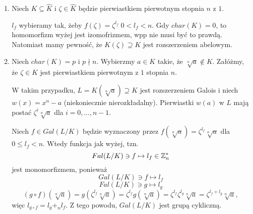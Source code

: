 \begin{enumerate}[leftmargin=*]
    \item Niech $K\subseteq\hat{K}$ i $\zeta\in\hat{K}$ będzie pierwiastkiem pierwotnym stopnia $n$ z $1$.
    
    \begin{center}\end{center}
    $l_f$ wybieramy tak, żeby $f(\zeta)=\zeta^{l_f}\;0<l_f<n$. Gdy $char(K)=0$, to homomorfizm wyżej jest izomofrizmem, wpp nie musi być to prawdą. Natomiast mamy pewność, że $K(\zeta)\supseteq K$ jest rozszerzeniem abelowym.
    \item Niech $char(K)=p$ i $p\nmid n$. Wybierzmy $a\in K$ takie, że $\sqrt[n]{a}\notin K$. Załóżmy, że $\zeta\in K$ jest pierwiastkiem pierwotnym z $1$ stopnia $n$.

    W takim przypadku, $L=K(\sqrt[n]{a})\supseteq K$ jest rozszerzeniem Galois i niech $w(x)=x^n-a$ (niekoniecznie nierozkładalny). Pierwiastki $w(a)$ w $L$ mają postać $\zeta^i\sqrt[n]{a}$ dla $i=0,...,n-1$.

    Niech $f\in Gal(L/K)$ będzie wyznaczony przez $f(\sqrt[n]{a})=\zeta^{l_f}\sqrt[n]{a}$ dla $0\leq l_f<n$. Wtedy funkcja jak wyżej, tzn.
    $$Fal(L/K)\ni f\mapsto l_f\in \mathbb{Z}_n^*$$
    jest monomorfizmem, ponieważ
    $$Gal(L/K)\ni f\mapsto l_f$$
    $$Fal(L/K)\ni g\mapsto l_g$$
    $$(g\circ f)(\sqrt[n]{a})=g(\zeta^{l_f}\sqrt[n]{a})=\zeta^{l_f}g(\sqrt[n]{a})=\zeta^{l_f}\zeta^{l_g}\sqrt[n]{a}=\zeta^{l_f+l_g}\sqrt[n]{a},$$
    więc $l_{g\circ f}=l_g+_n l_f$. Z tego powodu, $Gal(L/K)$ jest grupą cykliczną.
\end{enumerate}

